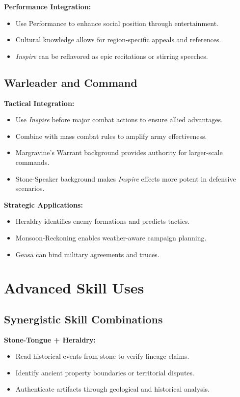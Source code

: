 \textbf{Performance Integration:}
\begin{itemize}
\item Use Performance to enhance social position through entertainment.
\item Cultural knowledge allows for region-specific appeals and references.
\item \emph{Inspire} can be reflavored as epic recitations or stirring speeches.
\end{itemize}

\subsection{Warleader and Command}
\label{subsec:warleader-command}

\textbf{Tactical Integration:}
\begin{itemize}
\item Use \emph{Inspire} before major combat actions to ensure allied advantages.
\item Combine with mass combat rules to amplify army effectiveness.
\item Margravine's Warrant background provides authority for larger-scale commands.
\item Stone-Speaker background makes \emph{Inspire} effects more potent in defensive scenarios.
\end{itemize}

\textbf{Strategic Applications:}
\begin{itemize}
\item Heraldry identifies enemy formations and predicts tactics.
\item Monsoon-Reckoning enables weather-aware campaign planning.
\item Geasa can bind military agreements and truces.
\end{itemize}

\section{Advanced Skill Uses}
\label{sec:advanced-skills}

\subsection{Synergistic Skill Combinations}
\label{subsec:skill-synergies}

\textbf{Stone-Tongue + Heraldry:}
\begin{itemize}
\item Read historical events from stone to verify lineage claims.
\item Identify ancient property boundaries or territorial disputes.
\item Authenticate artifacts through geological and historical analysis.
\end{itemize}


